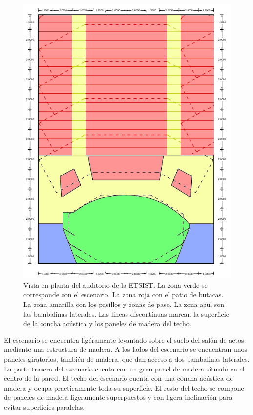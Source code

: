 \documentclass[11pt,a4paper]{book}
\begin{document}
 			\begin{figure}
				\includegraphics[scale=0.6]{../imagenes/auditorioColor.png}
				\centering
				\caption{Vista en planta del auditorio de la ETSIST. La zona verde se corresponde con el escenario. La zona roja con el patio de butacas. La zona amarilla con los pasillos y zonas de paso. La zona azul son las bambalinas laterales. Las lineas discontínuas marcan la superficie de la concha acústica y los paneles de madera del techo.}
				\label{fig:auditorio}
			\end{figure}
 
 			El escenario se encuentra ligéramente levantado sobre el suelo del salón de actos mediante una estructura de madera. A los lados del escenario se encuentran unos paneles giratorios, también de madera, que dan acceso a dos bambalinas laterales. La parte trasera del escenario cuenta con un gran panel de madera situado en el centro de la pared. El techo del escenario cuenta con una concha acústica de madera y ocupa practicamente toda su superficie. El resto del techo se compone de paneles de madera ligeramente superpuestos y con ligera inclinación para evitar superficies paralelas.
 
\end{document}
